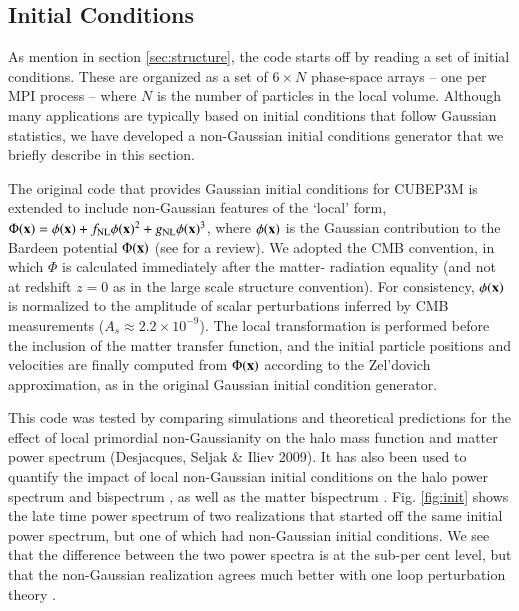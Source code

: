 \subsection{Initial Conditions}
\label{subsec:init}

As mention in section \ref{sec:structure}, the code starts off by reading a set of initial conditions.
These are organized as a set of $6 \times N$ phase-space arrays -- one per {\small MPI} process -- where $N$ is the number of particles in the
local volume. Although many applications are typically based on initial conditions that follow Gaussian statistics,
we have developed a non-Gaussian initial conditions generator that we briefly describe in this section. 


The original code that provides Gaussian initial conditions for {\small CUBEP3M} 
is extended to include non-Gaussian features of the `local' form,
$\Phi({\bf x})=\phi({\bf x})+f_{\rm NL} \phi({\bf x})^2 + g_{\rm NL} 
\phi({\bf x})^3$, where $\phi({\bf x})$ is the Gaussian contribution
to the Bardeen potential $\Phi({\bf x})$ (see \cite{2004PhR...402..103B} for a review). 
We adopted the CMB convention,
in which $\Phi$ is calculated immediately after the matter-
radiation equality (and not at redshift $z=0$ as in the large scale
structure convention). For consistency, $\phi({\bf x})$ is normalized
to the amplitude of scalar perturbations inferred by CMB measurements
($A_s\approx 2.2 \times 10^{-9}$). The local transformation is performed 
before the inclusion of the matter transfer function, and the initial 
particle positions and velocities are finally computed from $\Phi({\bf x})$ 
according to the Zel'dovich approximation, as in the original Gaussian initial condition generator.

This code was tested by comparing simulations and theoretical predictions
for the effect of local primordial non-Gaussianity on the halo mass 
function and matter power spectrum (Desjacques, Seljak \& Iliev 2009). 
It has also been used to quantify the impact of local non-Gaussian initial
conditions on the halo power spectrum \citep{2009MNRAS.396...85D,
2010PhRvD..81b3006D} and bispectrum \citep{2010MNRAS.406.1014S},
 as well as the matter bispectrum \citep{2011arXiv1111.6966S}.
Fig. \ref{fig:init} shows the late time power spectrum of two realizations that started off the same initial power spectrum, 
but one of which had non-Gaussian initial conditions.
We see that the difference between the two power spectra is at the sub-per cent level, but that the non-Gaussian realization
agrees much better with one loop perturbation theory \citep{XXX}.

